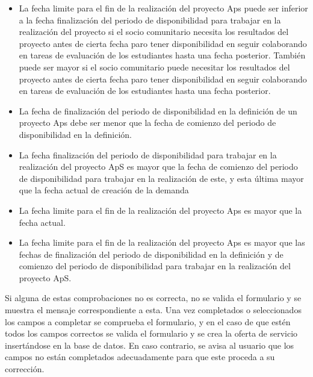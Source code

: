 \documentclass[11pt]{book}
\begin{document}
\begin{itemize}
 \item La fecha limite para el fin de la realización del proyecto Aps puede ser inferior a la fecha finalización del periodo de disponibilidad para trabajar en la realización del proyecto si el socio comunitario necesita los resultados del proyecto antes de cierta fecha paro tener disponibilidad en seguir colaborando en tareas de evaluación de los estudiantes hasta una fecha posterior. También puede ser mayor si el socio comunitario puede necesitar los resultados del proyecto antes de cierta fecha paro tener disponibilidad en seguir colaborando en tareas de evaluación de los estudiantes hasta una fecha posterior.
  \item La fecha de finalización del periodo de disponibilidad en la definición de un proyecto Aps debe ser menor que la fecha de comienzo del periodo de disponibilidad en la definición.
  \item La fecha finalización del periodo de disponibilidad para trabajar en la realización
del proyecto ApS es mayor que la fecha de comienzo del periodo de disponibilidad para trabajar en la realización de este, y esta última mayor que la fecha actual de creación de la demanda 
  \item La fecha limite para el fin de la realización del proyecto Aps es mayor que la fecha actual.
  \item La fecha limite para el fin de la realización del proyecto Aps es mayor que las fechas de finalización del periodo de disponibilidad en la definición y de comienzo del periodo de disponibilidad para trabajar en la realización del proyecto ApS. 

\end{itemize}
Si alguna de estas comprobaciones no es correcta, no se valida el formulario y se muestra el mensaje correspondiente a esta. Una vez completados o seleccionados los campos a completar se comprueba el formulario, y en el caso de que estén todos los campos correctos se valida el formulario y se crea la oferta de servicio insertándose en la base de datos. En caso contrario, se avisa al usuario que los campos no están completados adecuadamente para que este proceda a su corrección.\\\\
\end{document}
